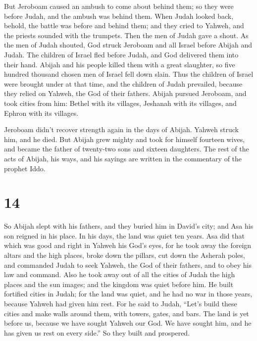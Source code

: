  But Jeroboam caused an ambush to come about behind them;
so they were before Judah, and the ambush was behind them. 
When Judah looked back, behold, the battle was before and behind them;
and they cried to Yahweh, and the priests sounded with the trumpets.
 Then the men of Judah gave a shout. As the men of Judah
shouted, God struck Jeroboam and all Israel before Abijah and Judah.
 The children of Israel fled before Judah, and God
delivered them into their hand.  Abijah and his people
killed them with a great slaughter, so five hundred thousand chosen men
of Israel fell down slain.  Thus the children of Israel
were brought under at that time, and the children of Judah prevailed,
because they relied on Yahweh, the God of their fathers. 
Abijah pursued Jeroboam, and took cities from him: Bethel with its
villages, Jeshanah with its villages, and Ephron with its villages.

 Jeroboam didn't recover strength again in the days of
Abijah. Yahweh struck him, and he died.  But Abijah grew
mighty and took for himself fourteen wives, and became the father of
twenty-two sons and sixteen daughters.  The rest of the
acts of Abijah, his ways, and his sayings are written in the commentary
of the prophet Iddo.

\hypertarget{section-13}{%
\section{14}\label{section-13}}

 So Abijah slept with his fathers, and they buried him in
David's city; and Asa his son reigned in his place. In his days, the
land was quiet ten years.  Asa did that which was good and
right in Yahweh his God's eyes,  for he took away the
foreign altars and the high places, broke down the pillars, cut down the
Asherah poles,  and commanded Judah to seek Yahweh, the God
of their fathers, and to obey his law and command.  Also he
took away out of all the cities of Judah the high places and the sun
images; and the kingdom was quiet before him.  He built
fortified cities in Judah; for the land was quiet, and he had no war in
those years, because Yahweh had given him rest.  For he said
to Judah, ``Let's build these cities and make walls around them, with
towers, gates, and bars. The land is yet before us, because we have
sought Yahweh our God. We have sought him, and he has given us rest on
every side.'' So they built and prospered.

